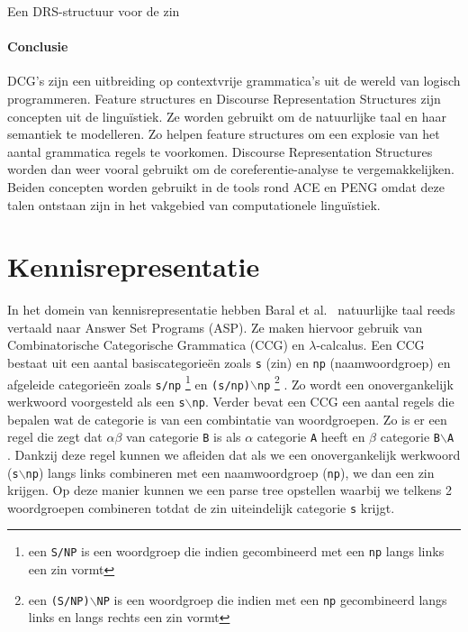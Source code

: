 \begin{savenotes}
  \begin{drsFloat}
    \centering
    \caption{Een DRS-structuur voor de zin  \protect\footnotemark}
    \label{drs:example}
  \end{drsFloat}
\end{savenotes}


\paragraph{Conclusie} DCG's zijn een uitbreiding op contextvrije grammatica's uit de wereld van logisch programmeren. Feature structures en Discourse Representation Structures zijn concepten uit de lingu\"istiek. Ze worden gebruikt om de natuurlijke taal en haar semantiek te modelleren. Zo helpen feature structures om een explosie van het aantal grammatica regels te voorkomen. Discourse Representation Structures worden dan weer vooral gebruikt om de coreferentie-analyse te vergemakkelijken. Beiden concepten worden gebruikt in de tools rond ACE en PENG omdat deze talen ontstaan zijn in het vakgebied van computationele lingu\"istiek.

\section{Kennisrepresentatie}
\label{sec:ASP}
In het domein van kennisrepresentatie hebben Baral et al.\ \cite{Baral2008} natuurlijke taal reeds vertaald naar Answer Set Programs (ASP). Ze maken hiervoor gebruik van Combinatorische Categorische Grammatica (CCG) en $\lambda$-calcalus. Een CCG bestaat uit een aantal basiscategorie\"en zoals \texttt{s} (zin) en \texttt{np} (naamwoordgroep) en afgeleide categorie\"en zoals \texttt{s/np} \footnote{een \texttt{S/NP} is een woordgroep die indien gecombineerd met een \texttt{np} langs links een zin vormt} en \texttt{(s/np)$\backslash$np} \footnote{een \texttt{(S/NP)$\backslash$NP} is een woordgroep die indien met een \texttt{np} gecombineerd langs links en langs rechts een zin vormt} \cite{Baral2008}. Zo wordt een onovergankelijk werkwoord voorgesteld als een \texttt{s$\backslash$np}. Verder bevat een CCG een aantal regels die bepalen wat de categorie is van een combintatie van woordgroepen. Zo is er een regel die zegt dat $\alpha\beta$ van categorie \texttt{B} is als $\alpha$ categorie \texttt{A} heeft en $\beta$ categorie \texttt{B$\backslash$A} \cite{Baral2008}. Dankzij deze regel kunnen we afleiden dat als we een onovergankelijk werkwoord (\texttt{s$\backslash$np}) langs links combineren met een naamwoordgroep (\texttt{np}), we dan een zin krijgen. Op deze manier kunnen we een parse tree opstellen waarbij we telkens 2 woordgroepen combineren totdat de zin uiteindelijk categorie \texttt{s} krijgt.

